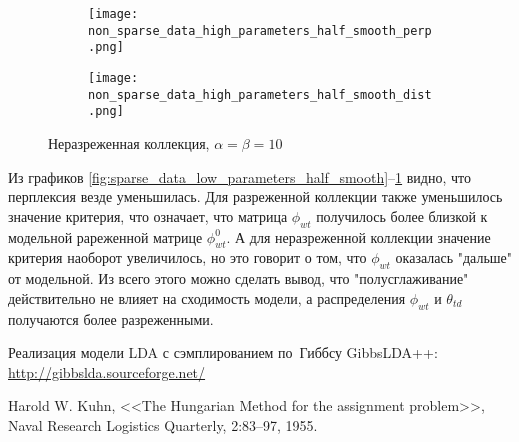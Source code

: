 \documentclass[12pt]{article}
\begin{document}
\begin{figure}[hbtp]
  \centering
  \begin{subfigure}[b]{0.49\textwidth}
    \centering
    \texttt{[image: non\_sparse\_data\_high\_parameters\_half\_smooth\_perp.png]}
  \end{subfigure}
  \begin{subfigure}[b]{0.49\textwidth}
    \centering
    \texttt{[image: non\_sparse\_data\_high\_parameters\_half\_smooth\_dist.png]}
  \end{subfigure}
  \caption{Неразреженная коллекция, $ \alpha = \beta = 10 $}
  \label{fig:non_sparse_data_high_parameters_half_smooth}
\end{figure}

Из графиков \ref{fig:sparse_data_low_parameters_half_smooth}--\ref{fig:non_sparse_data_high_parameters_half_smooth} видно, что перплексия везде уменьшилась.
Для разреженной коллекции также уменьшилось значение критерия, что означает, что матрица $ \phi_{wt} $ получилось более близкой к модельной рареженной матрице $ \phi_{wt}^0 $.
А для неразреженной коллекции значение критерия наоборот увеличилось, но это говорит о том, что $ \phi_{wt} $ оказалась "дальше" от модельной.
Из всего этого можно сделать вывод, что "полусглаживание" действительно не влияет на сходимость модели, а распределения $ \phi_{wt} $ и $ \theta_{td} $ получаются более разреженными.

\begin{thebibliography}{0}
  Реализация модели LDA с сэмплированием по~Гиббсу GibbsLDA++: \url{http://gibbslda.sourceforge.net/}

  Harold W. Kuhn, <<The Hungarian Method for the assignment problem>>, Naval Research Logistics Quarterly, 2:83–97, 1955.
\end{thebibliography}
\end{document}
